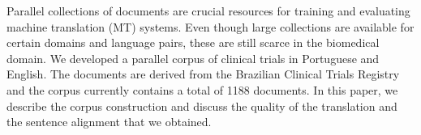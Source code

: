 Parallel collections of documents are crucial resources for training and evaluating machine translation (MT) systems. Even though large collections are available for certain domains and language pairs, these are still scarce in the biomedical domain. We developed a parallel corpus of clinical trials in Portuguese and English. The documents are derived from the Brazilian Clinical Trials Registry and the corpus currently contains a total of 1188 documents. In this paper, we describe the corpus construction and discuss the quality of the translation and the sentence alignment that we obtained.
